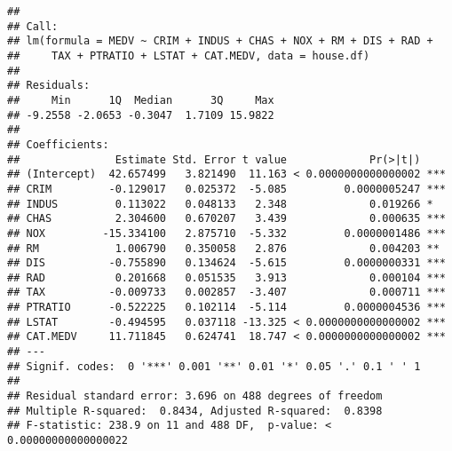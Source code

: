 \documentclass[
]{article}
\begin{document}
\begin{verbatim}
## 
## Call:
## lm(formula = MEDV ~ CRIM + INDUS + CHAS + NOX + RM + DIS + RAD + 
##     TAX + PTRATIO + LSTAT + CAT.MEDV, data = house.df)
## 
## Residuals:
##     Min      1Q  Median      3Q     Max 
## -9.2558 -2.0653 -0.3047  1.7109 15.9822 
## 
## Coefficients:
##               Estimate Std. Error t value             Pr(>|t|)    
## (Intercept)  42.657499   3.821490  11.163 < 0.0000000000000002 ***
## CRIM         -0.129017   0.025372  -5.085         0.0000005247 ***
## INDUS         0.113022   0.048133   2.348             0.019266 *  
## CHAS          2.304600   0.670207   3.439             0.000635 ***
## NOX         -15.334100   2.875710  -5.332         0.0000001486 ***
## RM            1.006790   0.350058   2.876             0.004203 ** 
## DIS          -0.755890   0.134624  -5.615         0.0000000331 ***
## RAD           0.201668   0.051535   3.913             0.000104 ***
## TAX          -0.009733   0.002857  -3.407             0.000711 ***
## PTRATIO      -0.522225   0.102114  -5.114         0.0000004536 ***
## LSTAT        -0.494595   0.037118 -13.325 < 0.0000000000000002 ***
## CAT.MEDV     11.711845   0.624741  18.747 < 0.0000000000000002 ***
## ---
## Signif. codes:  0 '***' 0.001 '**' 0.01 '*' 0.05 '.' 0.1 ' ' 1
## 
## Residual standard error: 3.696 on 488 degrees of freedom
## Multiple R-squared:  0.8434, Adjusted R-squared:  0.8398 
## F-statistic: 238.9 on 11 and 488 DF,  p-value: < 0.00000000000000022
\end{verbatim}
\end{document}
